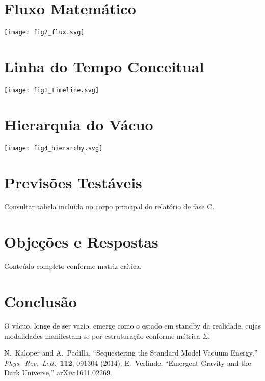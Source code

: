\documentclass[12pt]{article}
\begin{document}
\section{Fluxo Matemático}
\begin{center}
\texttt{[image: fig2\_flux.svg]}
\end{center}

\section{Linha do Tempo Conceitual}
\begin{center}
\texttt{[image: fig1\_timeline.svg]}
\end{center}

\section{Hierarquia do Vácuo}
\begin{center}
\texttt{[image: fig4\_hierarchy.svg]}
\end{center}

\section{Previsões Testáveis}
Consultar tabela incluída no corpo principal do relatório de fase C.

\section{Objeções e Respostas}
Conteúdo completo conforme matriz crítica.

\section{Conclusão}
O vácuo, longe de ser vazio, emerge como o estado em standby da realidade, cujas modalida\-des manifestam‑se por estruturação conforme métrica $\Sigma$.


\begin{thebibliography}{9}
 N.~Kaloper and A.~Padilla, ``Sequestering the Standard Model Vacuum Energy,'' \textit{Phys.\ Rev.\ Lett.}\ \textbf{112}, 091304 (2014).
 E.~Verlinde, ``Emergent Gravity and the Dark Universe,'' arXiv:1611.02269.
\end{thebibliography}
\end{document}
